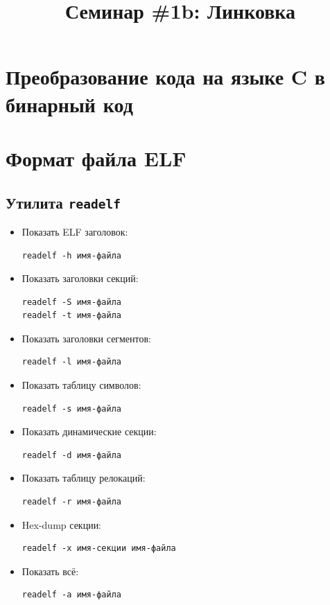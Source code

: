 \documentclass{article}
\begin{document}
\title{Семинар \#1b: Линковка \vspace{-5ex}}\date{}\maketitle

\section{Преобразование кода на языке C в бинарный код}

\section{Формат файла ELF}

\subsection*{Утилита \texttt{readelf}}
\begin{itemize}
\item Показать ELF заголовок:
\begin{lstlisting}[style=csMiptBash]
readelf -h имя-файла
\end{lstlisting}

\item Показать заголовки секций:
\begin{lstlisting}[style=csMiptBash]
readelf -S имя-файла
readelf -t имя-файла
\end{lstlisting}

\item Показать заголовки сегментов:
\begin{lstlisting}[style=csMiptBash]
readelf -l имя-файла
\end{lstlisting}

\item Показать таблицу символов:
\begin{lstlisting}[style=csMiptBash]
readelf -s имя-файла
\end{lstlisting}

\item Показать динамические секции:
\begin{lstlisting}[style=csMiptBash]
readelf -d имя-файла
\end{lstlisting}

\item Показать таблицу релокаций:
\begin{lstlisting}[style=csMiptBash]
readelf -r имя-файла
\end{lstlisting}

\item Hex-dump секции:
\begin{lstlisting}[style=csMiptBash]
readelf -x имя-секции имя-файла
\end{lstlisting}

\item Показать всё:
\begin{lstlisting}[style=csMiptBash]
readelf -a имя-файла
\end{lstlisting}
\end{itemize}
\end{document}
